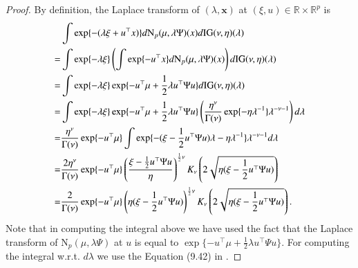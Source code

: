 \documentclass[12pt]{article}
\newcommand{\R}{\mathbb{R}}
\theoremstyle{plain}
\theoremstyle{definition}
\theoremstyle{remark}
\begin{document}
\begin{proof} 
By definition, the Laplace transform of $(\lambda, \mathbf{x})$  at  $(\xi, u)\in \R\times \R^{p}$  is 
\begin{align*}\label{eq:Laplace_t_gaussian}
\notag
&\int\exp\{ -(\lambda\xi+ u^{\top}x)\}d\mathrm{N}_{p}(\mu, \lambda\Psi)(x)d\mathrm{IG}(\nu, \eta)(\lambda)\\
=&\int\exp\{ -\lambda\xi\}\left(\int\exp\{- u^{\top}x\}d\mathrm{N}_{p}(\mu, \lambda\Psi)(x)\right)d\mathrm {IG}(\nu, \eta)(\lambda)\\
\notag=&\int\exp\{ -\lambda\xi\}\exp\{-u^{\top}\mu+\frac{1}{2}\lambda u^{\top}\Psi u  \}d\mathrm{IG}(\nu, \eta)(\lambda)\\
=&\int\exp\{ -\lambda\xi\}\exp\{-u^{\top}\mu+\frac{1}{2}\lambda u^{\top}\Psi u \}\left( \frac{\eta^{\nu}}{\Gamma(\nu)}\exp\{ -\eta\lambda^{-1}\}\lambda^{-\nu-1}\right) d\lambda\\
=&\frac{\eta^{\nu}}{\Gamma(\nu)}\exp\{- u^{\top}\mu\}\int \exp\{-(\xi-\frac{1}{2}u^{\top}\Psi u)\lambda -\eta\lambda^{-1}\} \lambda^{-\nu-1}d\lambda\\
=&\frac{2\eta^{\nu}}{\Gamma(\nu)}\exp\{- u^{\top}\mu\}\left(\frac{\xi-\frac{1}{2}u^{\top}\Psi u}{\eta}\right)^{\frac{1}{2}\nu} K_{\nu}\left(2\sqrt{\eta(\xi-\frac{1}{2}u^{\top}\Psi u)}\right) \\
=&\frac{2}{\Gamma(\nu)}\exp\{- u^{\top}\mu\}\left(\eta(\xi-\frac{1}{2}u^{\top}\Psi u)\right)^{\frac{1}{2}\nu} K_{\nu}\left(2\sqrt{\eta(\xi-\frac{1}{2}u^{\top}\Psi u)}\right).
\end{align*}
 Note that  in computing the integral above we have used the fact that the Laplace transform of $
\mathrm{N}_{p}(\mu, \lambda\Psi)$ at  $u$ is  equal to  $\exp\{ -u^{\top}\mu+\frac{1}{2}\lambda u^{\top}\Psi u\}$. For computing the integral w.r.t. $d\lambda$  we use the Equation (9.42) in \cite[page 235]{temme97}.

\end{proof}
\medskip
\end{document}
